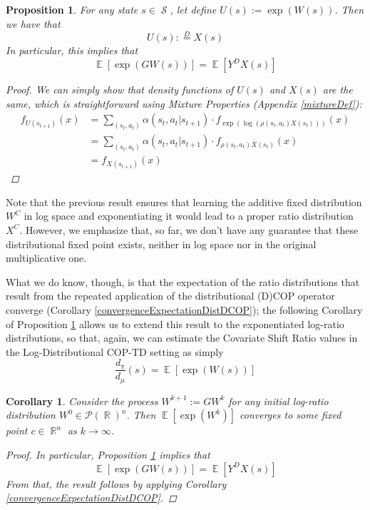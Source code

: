 \documentclass[12pt,a4paper,openright,twoside]{article}
\DeclareMathOperator*{\E}{\mathbb{E}}
\DeclareMathOperator*{\R}{\mathbb{R}}
\DeclareMathOperator*{\Sspace}{\mathcal{S}}
\numberwithin{equation}{section}
\newtheorem{prop}[theorem]{Proposition}
\newtheorem{corol}[theorem]{Corollary}
\theoremstyle{definition}
\theoremstyle{remark}
\theoremstyle{plain}
\begin{document}
\begin{prop} \label{circumventJensen}
	For any state $s \in \Sspace$, let define $U(s):= \exp (W(s))$. Then we have that
	\begin{equation*}
		 U(s) :\stackrel{D}{=} X(s)
	\end{equation*}
	In particular, this implies that
	\begin{equation*}
		\E [\exp (GW(s))] = \E [Y^D X(s)]
	\end{equation*}
	\begin{proof}
	We can simply show that density functions of $U(s)$ and $X(s)$ are the same, which is straightforward using Mixture Properties (Appendix \ref{mixtureDef}):
		\begin{equation}
		\begin{split}
			f_{U(s_{t+1})} (x) &= \sum_{(s_{t},a_{t})} \alpha(s_{t},a_{t}|s_{t+1}) \cdot f_{\exp \left( \log\left( \rho(s_{t},a_{t}) X(s_{t}) \right)\right)}(x) \\
			&= \sum_{(s_{t},a_{t})} \alpha(s_{t},a_{t}|s_{t+1}) \cdot f_{\rho(s_{t},a_{t}) X(s_{t})}(x) \\
			&= f_{X(s_{t+1})} (x)
		\end{split}
		\end{equation}
	\end{proof}
\end{prop}

Note that the previous result ensures that learning the additive fixed distribution $W^C$ in log space and exponentiating it would lead to a proper ratio distribution $X^C$. However, we emphasize that, so far, we don't have any guarantee that these distributional fixed point exists, neither in log space nor in the original multiplicative one. 

What we do know, though, is that the expectation of the ratio distributions that result from the repeated application of the distributional (D)COP operator converge (Corollary \ref{convergenceExpectationDistDCOP}); the following Corollary of Proposition \ref{circumventJensen} allows us to extend this result to the exponentiated log-ratio distributions, so that, again, we can estimate the Covariate Shift Ratio values in the Log-Distributional COP-TD setting as simply
\begin{equation*}
	\frac{d_\pi}{d_\mu}(s) = \E [\exp (W(s))]
\end{equation*}
\begin{corol}
	Consider the process $W^{k+1} := G W^k$ for any initial log-ratio distribution $W^0 \in \mathcal{P}(\R)^n$. Then $\E[\exp (W^{k})]$ converges to some fixed point $c \in \R^n$ as $k \rightarrow \infty$.
	
	\begin{proof}
		In particular, Proposition \ref{circumventJensen} implies that
		\begin{equation*}
			\E [\exp (GW(s))] = \E [Y^D X(s)]
		\end{equation*}
		From that, the result follows by applying Corollary \ref{convergenceExpectationDistDCOP}.
	\end{proof}
\end{corol}
\end{document}
